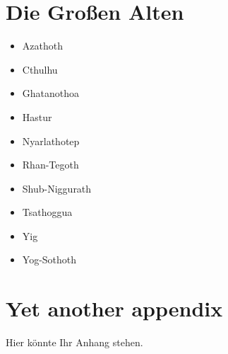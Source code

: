 \chapter{Die Großen Alten}

\begin{itemize}
\item Azathoth
\item Cthulhu
\item Ghatanothoa
\item Hastur
\item Nyarlathotep
\item Rhan-Tegoth
\item Shub-Niggurath
\item Tsathoggua
\item Yig
\item Yog-Sothoth
\end{itemize}

\chapter{Yet another appendix}

Hier könnte Ihr Anhang stehen.

